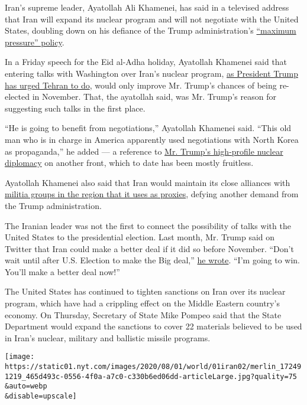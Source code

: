 Iran's supreme leader, Ayatollah Ali Khamenei, has said in a televised
address that Iran will expand its nuclear program and will not negotiate
with the United States, doubling down on his defiance of the Trump
administration's
\href{https://www.nytimes.com/2019/06/14/us/politics/us-iran.html}{``maximum
pressure'' policy}.

In a Friday speech for the Eid al-Adha holiday, Ayatollah Khamenei said
that entering talks with Washington over Iran's nuclear program,
\href{https://www.nytimes.com/2020/06/05/world/middleeast/trump-iran-nuclear.html}{as
President Trump has urged Tehran to do}, would only improve Mr. Trump's
chances of being re-elected in November. That, the ayatollah said, was
Mr. Trump's reason for suggesting such talks in the first place.

``He is going to benefit from negotiations,'' Ayatollah Khamenei said.
``This old man who is in charge in America apparently used negotiations
with North Korea as propaganda,'' he added --- a reference to
\href{https://www.nytimes.com/2020/04/19/world/asia/north-korea-denies-nice-note-trump.html}{Mr.
Trump's high-profile nuclear diplomacy} on another front, which to date
has been mostly fruitless.

Ayatollah Khamenei also said that Iran would maintain its close
alliances with
\href{https://www.nytimes.com/2016/11/20/world/middleeast/iran-saudi-proxy-war.html}{militia
groups in the region that it uses as proxies}, defying another demand
from the Trump administration.

The Iranian leader was not the first to connect the possibility of talks
with the United States to the presidential election. Last month, Mr.
Trump said on Twitter that Iran could make a better deal if it did so
before November. ``Don't wait until after U.S. Election to make the Big
deal,''
\href{https://twitter.com/realDonaldTrump/status/1268774841810911232}{he
wrote}. ``I'm going to win. You'll make a better deal now!''

The United States has continued to tighten sanctions on Iran over its
nuclear program, which have had a crippling effect on the Middle Eastern
country's economy. On Thursday, Secretary of State Mike Pompeo said that
the State Department would expand the sanctions to cover 22 materials
believed to be used in Iran's nuclear, military and ballistic missile
programs.

\texttt{[image: https://static01.nyt.com/images/2020/08/01/world/01iran02/merlin\_172491219\_465d493c-0556-4f0a-a7c0-c330b6ed06dd-articleLarge.jpg?quality=75\\\&auto=webp\\\&disable=upscale]}

